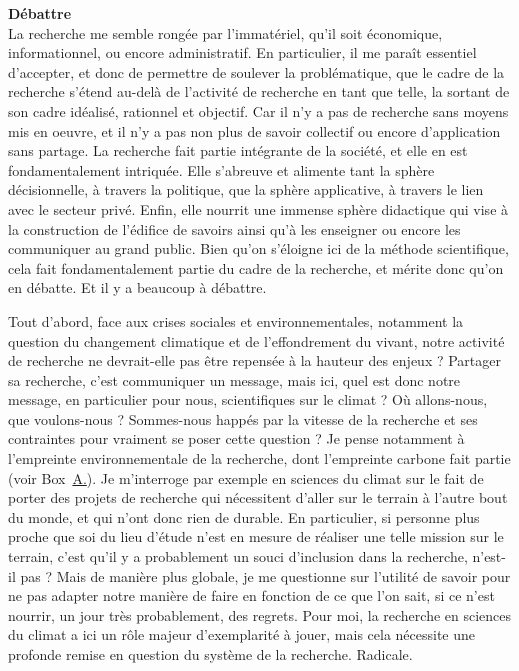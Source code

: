 {\noindent\Large\textbf{Débattre}}
\\

La recherche me semble rongée par l'immatériel, qu'il soit économique, informationnel, ou encore administratif. En particulier, il me paraît essentiel d'accepter, et donc de permettre de soulever la problématique, que le cadre de la recherche s'étend au-delà de l'activité de recherche en tant que telle, la sortant de son cadre idéalisé, rationnel et objectif. Car il n'y a pas de recherche sans moyens mis en oeuvre, et il n'y a pas non plus de savoir collectif ou encore d'application sans partage. La recherche fait partie intégrante de la société, et elle en est fondamentalement intriquée. Elle s'abreuve et alimente tant la sphère décisionnelle, à travers la politique, que la sphère applicative, à travers le lien avec le secteur privé. Enfin, elle nourrit une immense sphère didactique qui vise à la construction de l'édifice de savoirs ainsi qu'à les enseigner ou encore les communiquer au grand public. Bien qu'on s'éloigne ici de la méthode scientifique, cela fait fondamentalement partie du cadre de la recherche, et mérite donc qu'on en débatte. Et il y a beaucoup à débattre.


Tout d'abord, face aux crises sociales et environnementales, notamment la question du changement climatique et de l'effondrement du vivant, notre activité de recherche ne devrait-elle pas être repensée à la hauteur des enjeux ? Partager sa recherche, c'est communiquer un message, mais ici, quel est donc notre message, en particulier pour nous, scientifiques sur le climat ? Où allons-nous, que voulons-nous ? Sommes-nous happés par la vitesse de la recherche et ses contraintes pour vraiment se poser cette question ? Je pense notamment à l'empreinte environnementale de la recherche, dont l'empreinte carbone fait partie (voir Box~\hyperref[box:Empreinte]{\uppercase\expandafter{A\relax}.\theEmpreinte{}}). Je m'interroge par exemple en sciences du climat sur le fait de porter des projets de recherche qui nécessitent d'aller sur le terrain à l'autre bout du monde, et qui n'ont donc rien de durable. En particulier, si personne plus proche que soi du lieu d'étude n'est en mesure de réaliser une telle mission sur le terrain, c'est qu'il y a probablement un souci d'inclusion dans la recherche, n'est-il pas ? Mais de manière plus globale, je me questionne sur l'utilité de savoir pour ne pas adapter notre manière de faire en fonction de ce que l'on sait, si ce n'est nourrir, un jour très probablement, des regrets. Pour moi, la recherche en sciences du climat a ici un rôle majeur d'exemplarité à jouer, mais cela nécessite une profonde remise en question du système de la recherche. Radicale.

